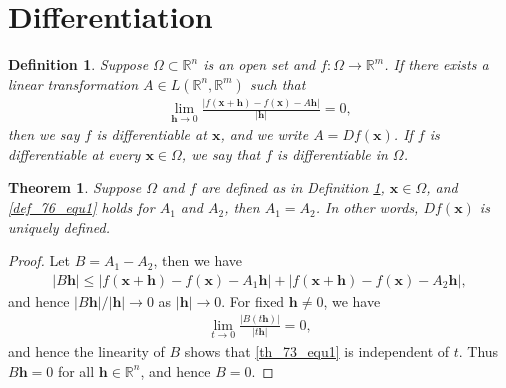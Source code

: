 \documentclass[11pt]{book}
\newtheorem{definition}{Definition}[chapter]
\newtheorem{theorem}{Theorem}[chapter]
\theoremstyle{definition}
\numberwithin{equation}{chapter}
\begin{document}
\medskip


\section{Differentiation}

\begin{definition}\label{def_76}
Suppose $\Omega \subset \mathbb{R}^n$ is an open set and $f: \Omega \to \mathbb{R}^m$. If there exists a linear transformation $A \in L(\mathbb{R}^n,\mathbb{R}^m)$ such that
\begin{align}\label{def_76_equ1}
    \lim_{\mathbf{h}\to 0} \frac{\left|f(\mathbf{x} + \mathbf{h}) - f(\mathbf{x}) - A\mathbf{h}\right|}{\left|\mathbf{h}\right|} = 0,
\end{align}
then we say $f$ is differentiable at $\mathbf{x}$, and we write $A = Df(\mathbf{x})$. If $f$ is differentiable at every $\mathbf{x} \in \Omega$, we say that $f$ is differentiable in $\Omega$.
\end{definition}

\medskip

\begin{theorem}\label{th_73}
Suppose $\Omega$ and $f$ are defined as in Definition \ref{def_76}, $\mathbf{x} \in \Omega$, and \eqref{def_76_equ1} holds for $A_1$ and $A_2$, then $A_1 = A_2$. In other words, $Df(\mathbf{x})$ is uniquely defined.
\end{theorem}
\begin{proof}
Let $B = A_1 - A_2$, then we have
\begin{align*}
    \left|B\mathbf{h}\right| \leq \left|f(\mathbf{x} + \mathbf{h}) - f(\mathbf{x}) - A_1 \mathbf{h}\right| + \left|f(\mathbf{x} + \mathbf{h}) - f(\mathbf{x}) - A_2 \mathbf{h}\right|,
\end{align*}
and hence $\left|B\mathbf{h}\right|/\left|\mathbf{h}\right| \to 0$ as $\left|\mathbf{h}\right| \to 0$. For fixed $\mathbf{h} \neq 0$, we have
\begin{align}\label{th_73_equ1}
    \lim_{t\to 0} \frac{\left|B(t\mathbf{h}) \right|}{\left|t\mathbf{h} \right|} = 0,
\end{align}
and hence the linearity of $B$ shows that \eqref{th_73_equ1} is independent of $t$. Thus $B\mathbf{h} = 0$ for all $\mathbf{h} \in \mathbb{R}^n$, and hence $B = 0$.
\end{proof}

\medskip
\end{document}
